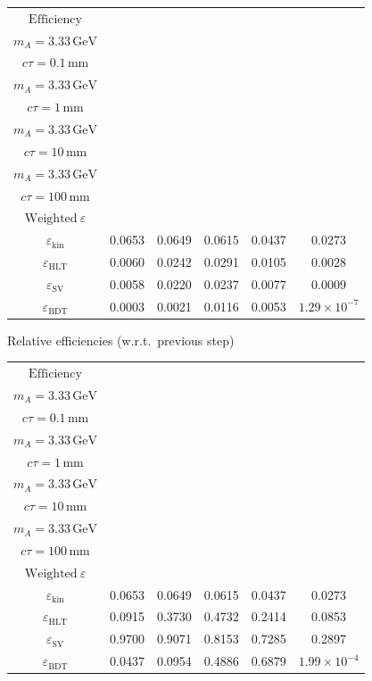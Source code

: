\documentclass[10pt,a4paper]{article}
\begin{document}
{\begin{tabular}{cccccc}
\toprule
$\mathrm{Efficiency}$ & \shortstack{$m_{\pi}=10\,\mathrm{GeV}$\\$m_{A}=3.33\,\mathrm{GeV}$\\$c\tau=0.1\,\mathrm{mm}$} & \shortstack{$m_{\pi}=10\,\mathrm{GeV}$\\$m_{A}=3.33\,\mathrm{GeV}$\\$c\tau=1\,\mathrm{mm}$} & \shortstack{$m_{\pi}=10\,\mathrm{GeV}$\\$m_{A}=3.33\,\mathrm{GeV}$\\$c\tau=10\,\mathrm{mm}$} & \shortstack{$m_{\pi}=10\,\mathrm{GeV}$\\$m_{A}=3.33\,\mathrm{GeV}$\\$c\tau=100\,\mathrm{mm}$} & \shortstack{$\mathrm{QCD}$\\$\mathrm{Weighted}\ \varepsilon$} \\
\midrule
$\varepsilon_{\mathrm{kin}}$ & 0.0653 & 0.0649 & 0.0615 & 0.0437 & 0.0273\\
$\varepsilon_{\mathrm{HLT}}$ & 0.0060 & 0.0242 & 0.0291 & 0.0105 & 0.0028\\
$\varepsilon_{\mathrm{SV}}$ & 0.0058 & 0.0220 & 0.0237 & 0.0077 & 0.0009\\
$\varepsilon_{\mathrm{BDT}}$ & 0.0003 & 0.0021 & 0.0116 & 0.0053 & $1.29\times10^{-7}$\\
\bottomrule
\end{tabular}

\vspace{18pt}

Relative efficiencies (w.r.t.\ previous step)

\begin{tabular}{cccccc}
\toprule
$\mathrm{Efficiency}$ & \shortstack{$m_{\pi}=10\,\mathrm{GeV}$\\$m_{A}=3.33\,\mathrm{GeV}$\\$c\tau=0.1\,\mathrm{mm}$} & \shortstack{$m_{\pi}=10\,\mathrm{GeV}$\\$m_{A}=3.33\,\mathrm{GeV}$\\$c\tau=1\,\mathrm{mm}$} & \shortstack{$m_{\pi}=10\,\mathrm{GeV}$\\$m_{A}=3.33\,\mathrm{GeV}$\\$c\tau=10\,\mathrm{mm}$} & \shortstack{$m_{\pi}=10\,\mathrm{GeV}$\\$m_{A}=3.33\,\mathrm{GeV}$\\$c\tau=100\,\mathrm{mm}$} & \shortstack{$\mathrm{QCD}$\\$\mathrm{Weighted}\ \varepsilon$} \\
\midrule
$\varepsilon_{\mathrm{kin}}$ & 0.0653 & 0.0649 & 0.0615 & 0.0437 & 0.0273\\
$\varepsilon_{\mathrm{HLT}}$ & 0.0915 & 0.3730 & 0.4732 & 0.2414 & 0.0853\\
$\varepsilon_{\mathrm{SV}}$ & 0.9700 & 0.9071 & 0.8153 & 0.7285 & 0.2897\\
$\varepsilon_{\mathrm{BDT}}$ & 0.0437 & 0.0954 & 0.4886 & 0.6879 & $1.99\times10^{-4}$\\
\bottomrule
\end{tabular}

}
\end{document}
